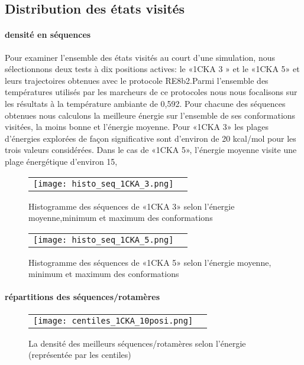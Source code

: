     \clearpage
   \subsection{Distribution des états visités }
   \paragraph{densité en séquences}
Pour examiner l'ensemble des états visités au court d'une simulation, nous sélectionnons deux tests à dix positions actives: le «1CKA 3 » et le «1CKA 5» et leurs trajectoires obtenues avec le protocole RE8b2.Parmi l'ensemble des températures utilisés par les marcheurs de ce protocoles nous nous focalisons sur les résultats à la température ambiante de 0,592. 
Pour chacune des séquences obtenues nous calculons la meilleure énergie sur l'ensemble de ses conformations visitées, la moins bonne et l'énergie moyenne. Pour «1CKA 3» les plages d'énergies explorées de façon significative sont d'environ de 20 kcal/mol pour les trois valeurs considérées. Dans le cas de «1CKA 5», l'énergie moyenne visite une plage énergétique d'environ 15,  



    \begin{figure}[h]
      \centering
      \begin{tabular}{cc} 
        \texttt{[image: histo\_seq\_1CKA\_3.png]} &
      \end{tabular}
      
      \caption{Histogramme des séquences de «1CKA 3» selon l'énergie moyenne,minimum et maximum des conformations}
\label{graph:densité_en_séquences1}
    \end{figure}


    \begin{figure}[h]
      \centering
      \begin{tabular}{cc} 
        \texttt{[image: histo\_seq\_1CKA\_5.png]} &
      \end{tabular}
      
      \caption{Histogramme des séquences de «1CKA 5» selon l'énergie moyenne, minimum et maximum des conformations}
\label{graph:densité_en_séquences2}
    \end{figure}

    \clearpage
   \paragraph{répartitions des séquences/rotamères}

    \begin{figure}[h]
      \centering
      \begin{tabular}{cc} 
        \texttt{[image: centiles\_1CKA\_10posi.png]} &
      \end{tabular}
      
      \caption{La densité des meilleurs séquences/rotamères selon l'énergie (représentée par les centiles)}
\label{graph:densité_en_séquences1}
    \end{figure}

    \clearpage





